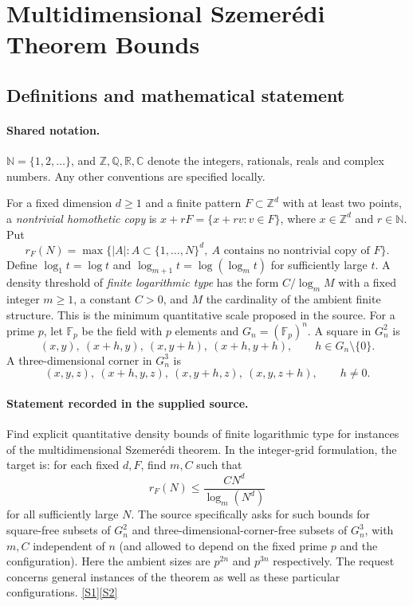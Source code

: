 \documentclass[11pt]{article}
\newcommand{\sref}[2]{\hyperlink{source:#1:#2}{[S#2]}}
\begin{document}
\section{Multidimensional Szemerédi Theorem Bounds}\label{statement}

\subsection{Definitions and mathematical statement}

\paragraph{Shared notation.}$\mathbb N=\{1,2,\ldots\}$, and $\mathbb Z,\mathbb Q,\mathbb R,\mathbb C$ denote the integers, rationals, reals and complex numbers. Any other conventions are specified locally.


For a fixed dimension $d\ge1$ and a finite pattern $F\subset\mathbb Z^d$ with at least two points, a \emph{nontrivial homothetic copy} is $x+rF=\{x+rv:v\in F\}$, where $x\in\mathbb Z^d$ and $r\in\mathbb N$. Put
\[
r_F(N)=\max\{|A|:A\subset\{1,\ldots,N\}^d,\ A\text{ contains no nontrivial copy of }F\}.
\]
Define $\log_1 t=\log t$ and $\log_{m+1}t=\log(\log_m t)$ for sufficiently large $t$. A density threshold of \emph{finite logarithmic type} has the form $C/\log_m M$ with a fixed integer $m\ge1$, a constant $C>0$, and $M$ the cardinality of the ambient finite structure. This is the minimum quantitative scale proposed in the source.
For a prime $p$, let $\mathbb F_p$ be the field with $p$ elements and $G_n=(\mathbb F_p)^n$. A square in $G_n^2$ is
\[
(x,y),\ (x+h,y),\ (x,y+h),\ (x+h,y+h),\qquad h\in G_n\setminus\{0\}.
\]
A three-dimensional corner in $G_n^3$ is
\[
(x,y,z),\ (x+h,y,z),\ (x,y+h,z),\ (x,y,z+h),\qquad h\ne0.
\]
\paragraph{Statement recorded in the supplied source.}
Find explicit quantitative density bounds of finite logarithmic type for instances of the multidimensional Szemerédi theorem. In the integer-grid formulation, the target is: for each fixed $d,F$, find $m,C$ such that
\[
r_F(N)\le\frac{C N^d}{\log_m(N^d)}
\]
for all sufficiently large $N$. The source specifically asks for such bounds for square-free subsets of $G_n^2$ and three-dimensional-corner-free subsets of $G_n^3$, with $m,C$ independent of $n$ (and allowed to depend on the fixed prime $p$ and the configuration). Here the ambient sizes are $p^{2n}$ and $p^{3n}$ respectively. The request concerns general instances of the theorem as well as these particular configurations. \sref{statement}{1}\sref{statement}{2}
\end{document}
